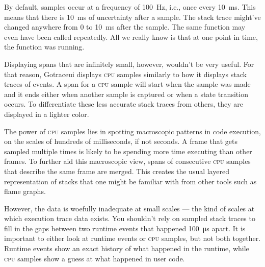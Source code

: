 \documentclass[10pt,letterpaper,oneside,openany,english]{memoir}
\begin{document}
By default, samples occur at a frequency of \qty{100}{\hertz}, i.e., once every \qty{10}{\milli\second}.
This means that there is \qty{10}{\milli\second} of uncertainty after a sample.
The stack trace might've changed anywhere from \num{0} to \qty{10}{\milli\second} after the sample.
The same function may even have been called repeatedly.
All we really know is that at one point in time, the function was running.

Displaying spans that are infinitely small, however, wouldn't be very useful.
For that reason, Gotraceui displays \textsc{cpu} samples similarly to how it displays stack traces of events.
A span for a \textsc{cpu} sample will start when the sample was made and it ends either when another sample is captured or when a state transition occurs.
To differentiate these less accurate stack traces from others, they are displayed in a lighter color.

The power of \textsc{cpu} samples lies in spotting macroscopic patterns in code execution, on the scales of hundreds of milliseconds, if not seconds.
A frame that gets sampled multiple times is likely to be spending more time executing than other frames.
To further aid this macroscopic view, spans of consecutive \textsc{cpu} samples that describe the same frame are merged.
This creates the usual layered representation of stacks that one might be familiar with from other tools such as flame graphs.

However, the data is woefully inadequate at small scales --- the kind of scales at which execution trace data exists.
You shouldn't rely on sampled stack traces to fill in the gaps between two runtime events that happened \qty{100}{\micro\second} apart.
It is important to either look at runtime events or \textsc{cpu} samples, but not both together.
Runtime events show an exact history of what happened in the runtime, while \textsc{cpu} samples show a guess at what happened in user code.
\end{document}
